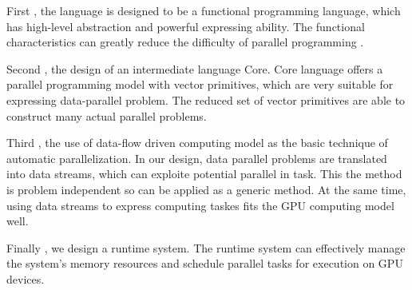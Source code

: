\begin{eabstract}
First , the language is designed to be a functional programming language,
which has high-level abstraction and powerful expressing ability.
The functional characteristics can greatly reduce the difficulty of parallel programming .

Second , the design of an intermediate language Core.
Core language offers a parallel programming model with vector primitives,
which are very suitable for expressing data-parallel problem.
The reduced set of vector primitives are able to construct many
actual parallel problems.


Third , the use of data-flow driven computing model as the basic technique of automatic parallelization.
In our design, data parallel problems are translated into data streams,
which can exploite potential parallel in task. This the method
is problem independent so can be applied as a generic method.
At the same time, using data streams to express computing taskes fits
the GPU computing model well.

Finally , we design a runtime system. The runtime system can effectively manage the system's
memory resources and schedule parallel tasks for execution on GPU devices.
\end{eabstract}


